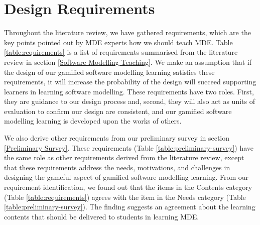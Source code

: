 \documentclass[12pt, a4paper]{report}
\begin{document}
\section{Design Requirements}
Throughout the literature review, we have gathered requirements, which are the key points pointed out by MDE experts how we should teach MDE. Table \ref{table:requirements} is a list of requirements summarised from the literature review in section \ref{Software Modelling Teaching}. We make an assumption that if the design of our gamified software modelling learning satisfies these requirements, it will increase the probability of the design will succeed supporting learners in learning software modelling. These requirements have two roles. First, they are guidance to our design process and, second, they will also act as units of evaluation to confirm our design are consistent, and our gamified software modelling learning is developed upon the works of others. 
 
We also derive other requirements from our preliminary survey in section \ref{Preliminary Survey}. These requirements (Table \ref{table:preliminary-survey}) have the same role as other requirements derived from the literature review, except that these requirements address the needs, motivations, and challenges in designing the gameful aspect of gamified software modelling learning. From our requirement identification, we found out that the items in the Contents category (Table \ref{table:requirements}) agrees with the item in the Needs category (Table \ref{table:preliminary-survey}). The finding suggests an agreement about the learning contents that should be delivered to students in learning MDE.
\end{document}
